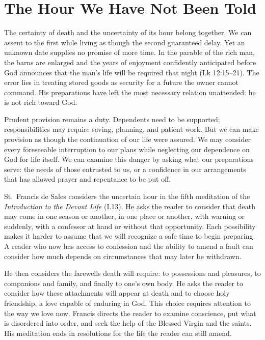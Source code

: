 \section{The Hour We Have Not Been Told}

The certainty of death and the uncertainty of its hour belong together. We can assent to the first while living as though the second guaranteed delay. Yet an unknown date supplies no promise of more time. In the parable of the rich man, the barns are enlarged and the years of enjoyment confidently anticipated before God announces that the man's life will be required that night (Lk 12:15--21). The error lies in treating stored goods as security for a future the owner cannot command. His preparations have left the most necessary relation unattended: he is not rich toward God.

Prudent provision remains a duty. Dependents need to be supported; responsibilities may require saving, planning, and patient work. But we can make provision as though the continuation of our life were assured. We may consider every foreseeable interruption to our plans while neglecting our dependence on God for life itself. We can examine this danger by asking what our preparations serve: the needs of those entrusted to us, or a confidence in our arrangements that has allowed prayer and repentance to be put off.

St.~Francis de Sales considers the uncertain hour in the fifth meditation of the \emph{Introduction to the Devout Life} (I.13). He asks the reader to consider that death may come in one season or another, in one place or another, with warning or suddenly, with a confessor at hand or without that opportunity. Each possibility makes it harder to assume that we will recognize a safe time to begin preparing. A reader who now has access to confession and the ability to amend a fault can consider how much depends on circumstances that may later be withdrawn.

He then considers the farewells death will require: to possessions and pleasures, to companions and family, and finally to one's own body. He asks the reader to consider how these attachments will appear at death and to choose holy friendship, a love capable of enduring in God. This choice requires attention to the way we love now. Francis directs the reader to examine conscience, put what is disordered into order, and seek the help of the Blessed Virgin and the saints. His meditation ends in resolutions for the life the reader can still amend.

